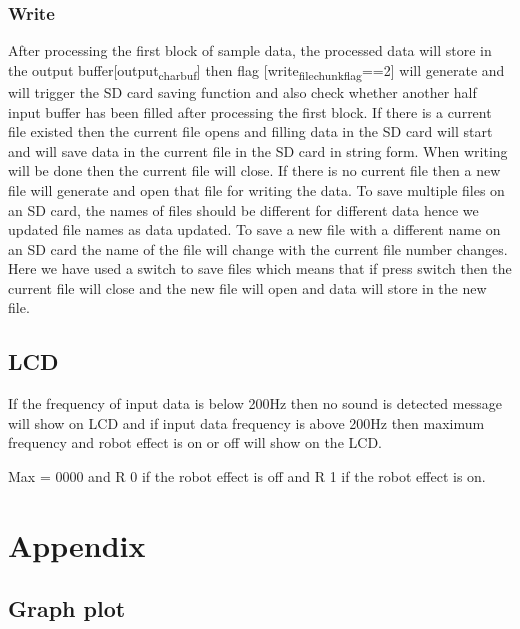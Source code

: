 \documentclass[11pt]{article}
\begin{document}
\subsubsection*{Write}
\label{sec:orgcb88853}

After processing the first block of sample data, the processed data will store in the output buffer[output\textsubscript{char}\textsubscript{buf}] then flag [write\textsubscript{file}\textsubscript{chunk}\textsubscript{flag}==2] will generate and will trigger the SD card saving function and also check whether another half input buffer has been filled after processing the first block. If there is a current file existed then the current file opens and filling data in the SD card will start and will save data in the current file in the SD card in string form. When writing will be done then the current file will close. If there is no current file then a new file will generate and open that file for writing the data.
To save multiple files on an SD card, the names of files should be different for different data hence we updated file names as data updated. To save a new file with a different name on an SD card the name of the file will change with the current file number changes.
Here we have used a switch to save files which means that if press switch then the current file will close and the new file will open and data will store in the new file.


\subsection{LCD}
\label{sec:org87487ab}

If the frequency of input data is below 200Hz then no sound is detected message will show on LCD and if input data frequency is above 200Hz then maximum frequency and robot effect is on or off will show on the LCD.

Max = 0000 and R 0 if the robot effect is off and R 1 if the robot effect is on.

\section{Appendix}
\label{sec:org36b9c13}
\subsection{Graph plot}
\label{sec:org9c7e5d3}
\end{document}
